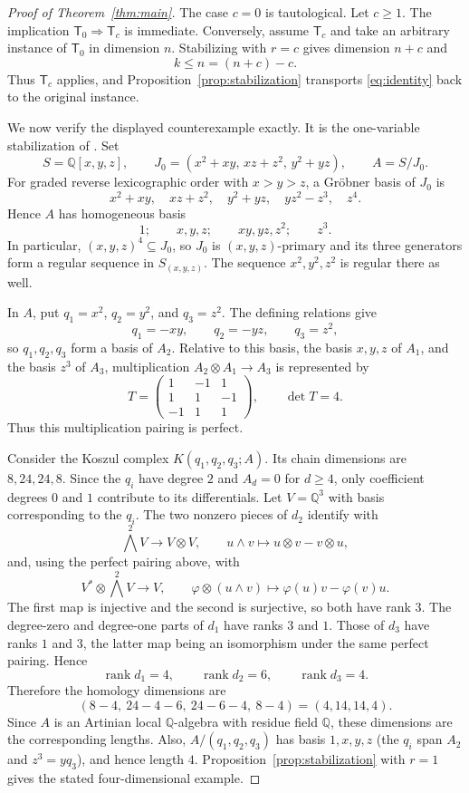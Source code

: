 \documentclass[11pt]{amsart}
\theoremstyle{remark}
\begin{document}
\begin{proof}[Proof of Theorem~\ref{thm:main}]
The case $c=0$ is tautological. Let $c\geq1$. The implication
$\mathsf T_0\Rightarrow\mathsf T_c$ is immediate. Conversely, assume
$\mathsf T_c$ and take an arbitrary instance of $\mathsf T_0$ in dimension
$n$. Stabilizing with $r=c$ gives dimension $n+c$ and
\[
 k\leq n=(n+c)-c.
\]
Thus $\mathsf T_c$ applies, and Proposition~\ref{prop:stabilization} transports
\eqref{eq:identity} back to the original instance.

We now verify the displayed counterexample exactly. It is the one-variable
stabilization of \cite[Example~3.1]{BLP}. Set
\[
 S=\mathbb Q[x,y,z],\qquad
 J_0=(x^2+xy,\,xz+z^2,\,y^2+yz),\qquad A=S/J_0.
\]
For graded reverse lexicographic order with $x>y>z$, a Gr\"obner basis of
$J_0$ is
\[
 x^2+xy,\quad xz+z^2,\quad y^2+yz,\quad yz^2-z^3,\quad z^4.
\]
Hence $A$ has homogeneous basis
\[
 1;\qquad x,y,z;\qquad xy,yz,z^2;\qquad z^3.
\]
In particular, $(x,y,z)^4\subseteq J_0$, so $J_0$ is $(x,y,z)$-primary and its
three generators form a regular sequence in $S_{(x,y,z)}$. The sequence
$x^2,y^2,z^2$ is regular there as well.

In $A$, put $q_1=x^2$, $q_2=y^2$, and $q_3=z^2$. The defining relations give
\[
 q_1=-xy,\qquad q_2=-yz,\qquad q_3=z^2,
\]
so $q_1,q_2,q_3$ form a basis of $A_2$. Relative to this basis, the basis
$x,y,z$ of $A_1$, and the basis $z^3$ of $A_3$, multiplication
$A_2\otimes A_1\to A_3$ is represented by
\[
 T=\begin{pmatrix}
 1&-1& 1\\
 1& 1&-1\\
-1& 1& 1
 \end{pmatrix},
 \qquad \det T=4.
\]
Thus this multiplication pairing is perfect.

Consider the Koszul complex $K(q_1,q_2,q_3;A)$. Its chain dimensions are
$8,24,24,8$. Since the $q_i$ have degree $2$ and $A_d=0$ for $d\geq4$, only
coefficient degrees $0$ and $1$ contribute to its differentials. Let
$V=\mathbb Q^3$ with basis corresponding to the $q_i$. The two nonzero pieces
of $d_2$ identify with
\[
 \bigwedge^2V\longrightarrow V\otimes V,
 \qquad u\wedge v\longmapsto u\otimes v-v\otimes u,
\]
and, using the perfect pairing above, with
\[
 V^*\otimes\bigwedge^2V\longrightarrow V,
 \qquad
 \varphi\otimes(u\wedge v)\longmapsto
 \varphi(u)v-\varphi(v)u.
\]
The first map is injective and the second is surjective, so both have rank $3$.
The degree-zero and degree-one parts of $d_1$ have ranks $3$ and $1$.
Those of $d_3$ have ranks $1$ and $3$, the latter map being an isomorphism
under the same perfect pairing. Hence
\[
 \operatorname{rank}d_1=4,\qquad
 \operatorname{rank}d_2=6,\qquad
 \operatorname{rank}d_3=4.
\]
Therefore the homology dimensions are
\[
 (8-4,\ 24-4-6,\ 24-6-4,\ 8-4)=(4,14,14,4).
\]
Since $A$ is an Artinian local $\mathbb Q$-algebra with residue field
$\mathbb Q$, these dimensions are the corresponding lengths. Also,
$A/(q_1,q_2,q_3)$ has basis $1,x,y,z$ (the $q_i$ span $A_2$ and
$z^3=yq_3$), and hence length $4$.
Proposition~\ref{prop:stabilization} with $r=1$ gives the stated
four-dimensional example.


\end{proof}
\end{document}
